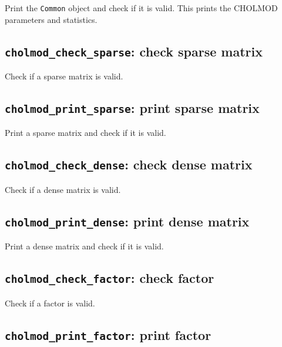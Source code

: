 \documentclass[11pt]{article}
\begin{document}

Print the {\tt Common} object and check if it is valid.
This prints the CHOLMOD parameters and statistics.

\newpage \subsection{{\tt cholmod\_check\_sparse}: check sparse matrix}


Check if a sparse matrix is valid.

\subsection{{\tt cholmod\_print\_sparse}: print sparse matrix}


Print a sparse matrix and check if it is valid.

\newpage \subsection{{\tt cholmod\_check\_dense}: check dense matrix}


Check if a dense matrix is valid.

\subsection{{\tt cholmod\_print\_dense}: print dense matrix}


Print a dense matrix and check if it is valid.

\newpage \subsection{{\tt cholmod\_check\_factor}: check factor}


Check if a factor is valid.

\subsection{{\tt cholmod\_print\_factor}: print factor}
\end{document}
